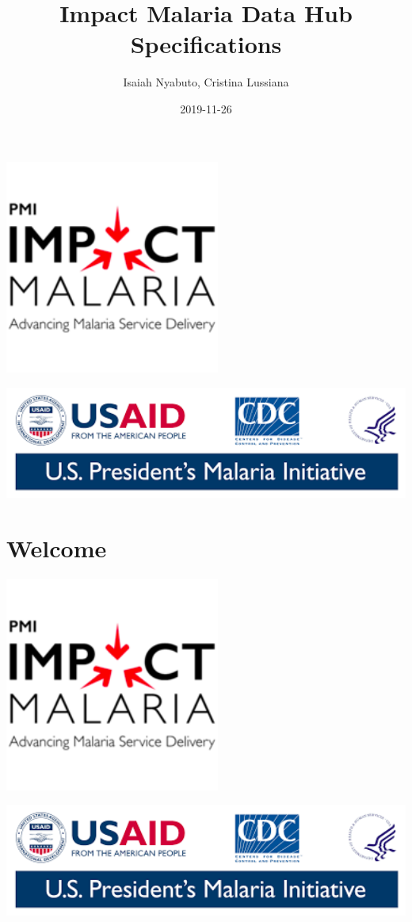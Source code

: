 \documentclass[]{book}
\title{Impact Malaria Data Hub Specifications}
\author{Isaiah Nyabuto, Cristina Lussiana}
\date{2019-11-26}
\begin{document}
\maketitle

{
\setcounter{tocdepth}{1}
\tableofcontents
}
\includegraphics[width=2.78in]{./images/logo1}

\includegraphics[width=5.93in]{./images/logo2}

\hypertarget{welcome}{%
\chapter*{Welcome}\label{welcome}}

\includegraphics[width=2.78in]{./images/logo1}

\includegraphics[width=5.93in]{./images/logo2}
\end{document}
